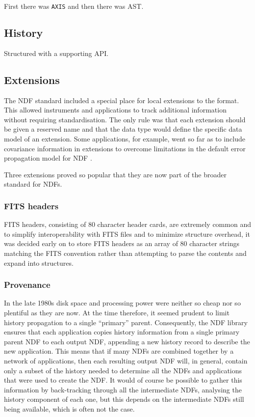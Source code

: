 \documentclass[final,authoryear,5p,times,twocolumn]{elsarticle}
\begin{document}
{{\color{red} First there was \texttt{AXIS} and then there was AST. \citep{1998ASPC..145...41W,2001ASPC..238..129B}}

\subsection{History}

{\color{red} Structured with a supporting API.}

\subsection{Extensions}

The NDF standard included a special place for local extensions to the
format. This allowed instruments and applications to track additional
information without requiring standardisation. The only rule was that
each extension should be given a reserved name and that the data type
would define the specific data model of an extension. Some
applications, for example, went so far as to include covariance
information in extensions to overcome limitations in the default error
propagation model for NDF \citep[for example SPECDRE;][]{SUN140}.

Three extensions proved so popular that they are now part of the broader
standard for NDFs.

\subsubsection{FITS headers}

FITS headers, consisting of 80 character header cards, are extremely
common and to simplify interoperability with FITS files and to
minimize structure overhead, it was decided early on to store FITS
headers as an array of 80 character strings matching the FITS
convention rather than attempting to parse the contents and expand
into structures.

\subsubsection{Provenance}

In the late 1980s disk space and processing power were neither so
cheap nor so plentiful as they are now. At the time therefore, it
seemed prudent to limit history propagation to a single ``primary''
parent. Consequently, the NDF library ensures that each application
copies history information from a single primary parent NDF to each
output NDF, appending a new history record to describe the new
application. This means that if many NDFs are combined together by a
network of applications, then each resulting output NDF will, in
general, contain only a subset of the history needed to determine all
the NDFs and applications that were used to create the NDF. It would
of course be possible to gather this information by back-tracking
through all the intermediate NDFs, analysing the history component of
each one, but this depends on the intermediate NDFs still being
available, which is often not the case.

}
\end{document}
